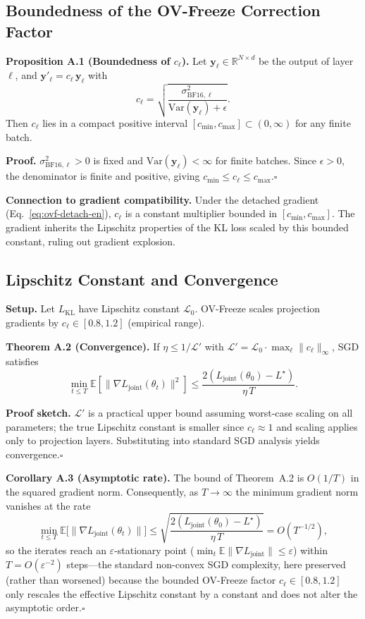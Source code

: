 \documentclass[final,5p,times,number]{elsarticle}
\begin{document}
\subsection{Boundedness of the OV-Freeze Correction Factor}\label{app:bounded}

\noindent\textbf{Proposition A.1 (Boundedness of $c_\ell$).} Let $\bm{y}_\ell\in\mathbb{R}^{N\times d}$ be the output of layer $\ell$, and $\bm{y}'_\ell = c_\ell\,\bm{y}_\ell$ with
\[
c_\ell = \sqrt{\frac{\sigma^2_{\mathrm{BF16},\ell}}{\mathrm{Var}(\bm{y}_\ell)+\epsilon}}.
\]
Then $c_\ell$ lies in a compact positive interval $[c_{\min}, c_{\max}] \subset (0, \infty)$ for any finite batch.

\noindent\textbf{Proof.} $\sigma^2_{\mathrm{BF16},\ell}>0$ is fixed and $\mathrm{Var}(\bm{y}_\ell)<\infty$ for finite batches. Since $\epsilon>0$, the denominator is finite and positive, giving $c_{\min}\le c_\ell\le c_{\max}$.\hfill$\square$

\medskip
\noindent\textbf{Connection to gradient compatibility.} Under the detached gradient (Eq.~\eqref{eq:ovf-detach-en}), $c_\ell$ is a constant multiplier bounded in $[c_{\min}, c_{\max}]$. The gradient inherits the Lipschitz properties of the KL loss scaled by this bounded constant, ruling out gradient explosion.

\subsection{Lipschitz Constant and Convergence}\label{app:lipschitz}

\noindent\textbf{Setup.} Let $L_{\mathrm{KL}}$ have Lipschitz constant $\mathcal{L}_0$. OV-Freeze scales projection gradients by $c_\ell\in[0.8,1.2]$ (empirical range).

\noindent\textbf{Theorem A.2 (Convergence).} If $\eta\le 1/\mathcal{L}'$ with $\mathcal{L}' = \mathcal{L}_0\cdot\max_\ell\|c_\ell\|_\infty$, SGD satisfies
\[
\min_{t\le T}\mathbb{E}[\|\nabla L_{\mathrm{joint}}(\theta_t)\|^2] \le \frac{2(L_{\mathrm{joint}}(\theta_0) - L^\star)}{\eta\,T}.
\]

\noindent\textbf{Proof sketch.} $\mathcal{L}'$ is a practical upper bound assuming worst-case scaling on all parameters; the true Lipschitz constant is smaller since $c_\ell\approx 1$ and scaling applies only to projection layers. Substituting into standard SGD analysis yields convergence.\hfill$\square$

\noindent\textbf{Corollary A.3 (Asymptotic rate).} The bound of Theorem~A.2 is $O(1/T)$ in the squared gradient norm. Consequently, as $T\to\infty$ the minimum gradient norm vanishes at the rate
\[
\min_{t\le T}\mathbb{E}\bigl[\|\nabla L_{\mathrm{joint}}(\theta_t)\|\bigr] \le \sqrt{\frac{2(L_{\mathrm{joint}}(\theta_0) - L^\star)}{\eta\,T}} = O\!\left(T^{-1/2}\right),
\]
so the iterates reach an $\varepsilon$-stationary point ($\min_t\mathbb{E}\|\nabla L_{\mathrm{joint}}\|\le\varepsilon$) within $T = O(\varepsilon^{-2})$ steps---the standard non-convex SGD complexity, here preserved (rather than worsened) because the bounded OV-Freeze factor $c_\ell\in[0.8,1.2]$ only rescales the effective Lipschitz constant by a constant and does not alter the asymptotic order.\hfill$\square$
\end{document}
